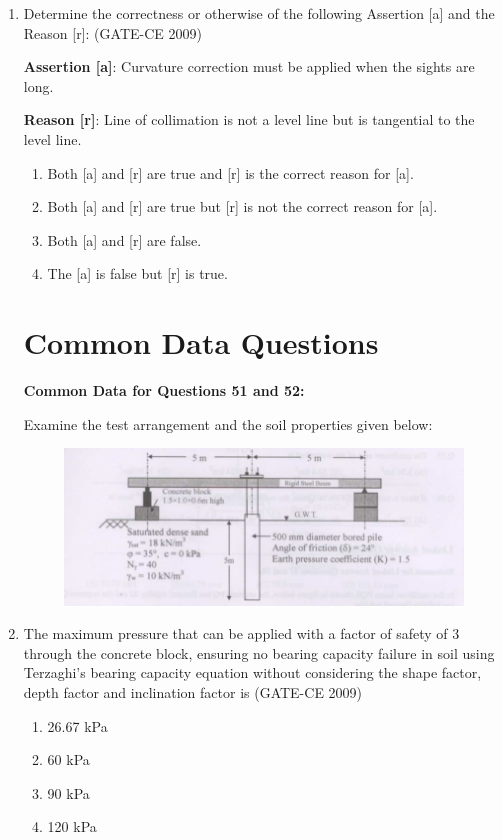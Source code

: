 \documentclass[journal,12pt,onecolumn]{article}
\theoremstyle{remark}
\begin{document}
\begin{enumerate}
    \item Determine the correctness or otherwise of the following Assertion [a] and the Reason [r]: (GATE-CE 2009)

    \textbf{Assertion [a]}: Curvature correction must be applied when the sights are long.

    \textbf{Reason [r]}: Line of collimation is not a level line but is tangential to the level line.
    \begin{enumerate}
        \item Both [a] and [r] are true and [r] is the correct reason for [a].
        \item Both [a] and [r] are true but [r] is not the correct reason for [a].
        \item Both [a] and [r] are false.
        \item The [a] is false but [r] is true.
    \end{enumerate}

\section*{Common Data Questions}
\textbf{Common Data for Questions 51 and 52:}

Examine the test arrangement and the soil properties given below:
\begin{figure}[H]
    \centering
    \includegraphics[width=0.7\columnwidth]{figs/image5.jpg}
    \label{fig:placeholder}
    \end{figure}

    \item The maximum pressure that can be applied with a factor of safety of 3 through the concrete block, ensuring no bearing capacity failure in soil using Terzaghi's bearing capacity equation without considering the shape factor, depth factor and inclination factor is (GATE-CE 2009)
    \begin{enumerate}
        \item 26.67 kPa 
        \item 60 kPa 
        \item 90 kPa 
        \item 120 kPa
    \end{enumerate}
    

\end{enumerate}
\end{document}
